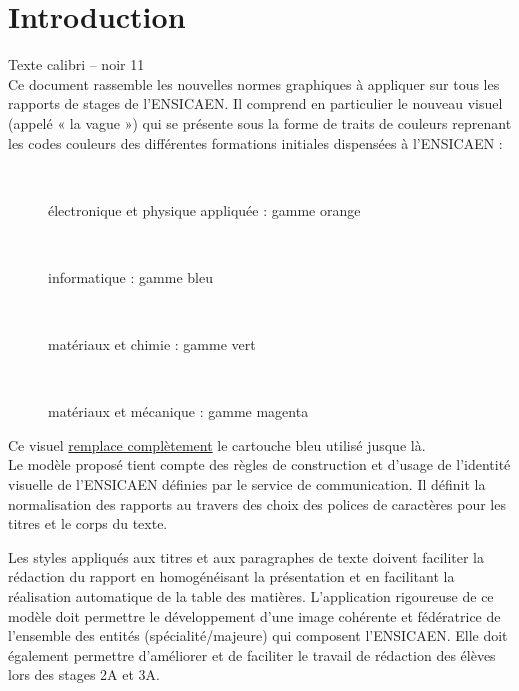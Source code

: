 \documentclass{rapportDeProjetENSICAEN}
\begin{document}


\tableofcontents


\listoffigures


\listoftables


\chapter{Introduction}
Texte calibri – noir 11 \\
Ce document rassemble les nouvelles normes graphiques à appliquer sur tous les rapports de stages de l’ENSICAEN. Il comprend en particulier le nouveau visuel (appelé « la vague ») qui se présente sous la forme de traits de couleurs reprenant les codes couleurs des différentes formations initiales dispensées à l’ENSICAEN :
\begin{description}
    \item[~~~~~~~~~~~~] électronique et physique appliquée : gamme orange
    \item[~~~~~~~~~~~~] informatique : gamme bleu
    \item[~~~~~~~~~~~~] matériaux et chimie : gamme vert
    \item[~~~~~~~~~~~~] matériaux et mécanique : gamme magenta
\end{description}
Ce visuel \underline{remplace complètement} le cartouche bleu utilisé jusque là. \\


Le modèle proposé tient compte des règles de construction et d’usage de l’identité visuelle de l’ENSICAEN définies par le service de communication. Il définit la normalisation des rapports au travers des choix des polices de caractères pour les titres et le corps du texte. 


Les styles appliqués aux titres et aux paragraphes de texte doivent faciliter la rédaction du rapport en homogénéisant la présentation et en facilitant la réalisation automatique de la table des matières.
L’application rigoureuse de ce modèle doit permettre le développement d’une image cohérente et fédératrice de l’ensemble des entités (spécialité/majeure) qui composent l’ENSICAEN. Elle doit également permettre d’améliorer et de faciliter le travail de rédaction des élèves lors des stages 2A et 3A.
\end{document}
